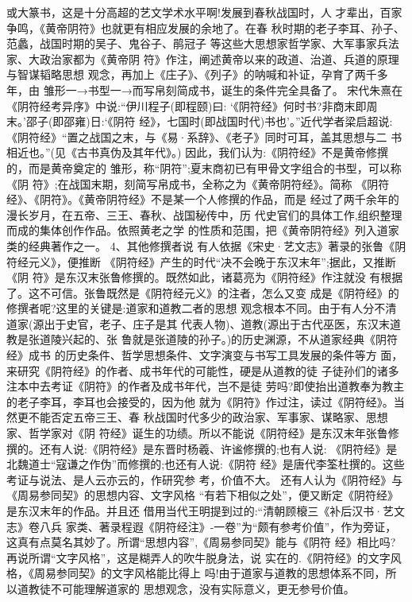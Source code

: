\documentclass[12pt,UTF8]{ctexbook}
\begin{document}
或大篆书，这是十分高超的艺文学术水平啊!发展到春秋战国时，人
才辈出，百家争鸣，《黄帝阴符》也就更有相应发展的余地了。在春
秋时期的老子李耳、孙子、范蠡，战国时期的吴子、鬼谷子、鹃冠子
等这些大思想家哲学家、大军事家兵法家、大政治家都为《黄帝阴
符》作注，阐述黄帝以来的政道、治道、兵道的原理与智谋韬略思想
观念，再加上《庄子》、《列子》的呐喊和补证，孕育了两千多年，由
雏形一→书型一→而写帛刻简成书，诞生的条件完全具备了。
宋代朱熹在《阴符经考异序》中说:“伊川程子(即程颐)曰:
‘《阴符经》何时书?非商末即周末。’邵子(即邵雍)日:‘《阴符
经》，七国时(即战国时代)书也’。”近代学者梁启超说:《阴符经》“置之战国之末，与《易·系辞》、《老子》同时可耳，盖其思想与二
书相近也。”(见《古书真伪及其年代》。)
因此，我们认为:《阴符经》不是黄帝修撰的，而是黄帝奠定的
雏形，称“阴符”;夏末商初已有甲骨文字组合的书型，可以称《阴
符》;在战国末期，刻简写帛成书，全称之为《黄帝阴符经》。简称
《阴符经》、《阴符》。《黄帝阴符经》不是某一个人修撰的作品，而是
经过了两千余年的漫长岁月，在五帝、三王、春秋、战国秘传中，历
代史官们的具体工作,组织整理而成的集体创作作品。依照黄老之学
的性质和范围，把《黄帝阴符经》列入道家类的经典著作之一。
4、其他修撰者说
有人依据《宋史·艺文志》著录的张鲁《阴符经元义》，便推断
《阴符经》产生的时代“决不会晚于东汉末年”;据此，又推断《阴
符》是东汉末张鲁修撰的。既然如此，诸葛亮为《阴符经》作注就没
有根据了。这不可信。张鲁既然是《阴符经元义》的注者，怎么又变
成是《阴符经》的修撰者呢?这里的关键是:道家和道教二者的思想
观念根本不同。由于有人分不清道家(源出于史官，老子、庄子是其
代表人物)、道教(源出于古代巫医，东汉末道教是张道陵兴起的、张
鲁就是张道陵的孙子。)的历史渊源，不从道家经典《阴符经》成书
的历史条件、哲学思想条件、文字演变与书写工具发展的条件等方
面，来研究《阴符经》的作者、成书年代的可能性，硬是从道教的徒
子徒孙们的诸多注本中去考证《阴符》的作者及成书年代，岂不是徒
劳吗?即使抬出道教奉为教主的老子李耳，李耳也会接受的，因为他
就为《阴符》作过注，读过《阴符经》。当然更不能否定五帝三王、春
秋战国时代多少的政治家、军事家、谋略家、思想家、哲学家对《阴
符经》诞生的功绩。所以不能说《阴符经》是东汉末年张鲁修撰的。还有人说:《阴符经》是东晋时杨羲、许谧修撰的;也有人说:
《阴符经》是北魏道士“寇谦之作伪”而修撰的;也还有人说:《阴符
经》是唐代李筌杜撰的。这些考证与说法、是人云亦云的，作研究参
考，价值不大。
还有人认为《阴符经》与《周易参同契》的思想内容、文字风格
“有若下相似之处”，便又断定《阴符经》是东汉末年的作品。并且还
借用当代王明提到过的:“清朝顾榱三《补后汉书·艺文志》卷八兵
家类、著录程遐《阴符经注》-一卷”为“颇有参考价值”，作为旁证，
这真有点莫名其妙了。所谓“思想内容”,《周易参同契》能与《阴符
经》相比吗?再说所谓“文字风格”，这是糊弄人的吹牛脱身法，说
实在的.《阴符经》的文字风格，《周易参同契》的文字风格能比得上
吗!由于道家与道教的思想体系不同，所以道教徒不可能理解道家的
思想观念，没有实际意义，更无参号价值。
\end{document}
